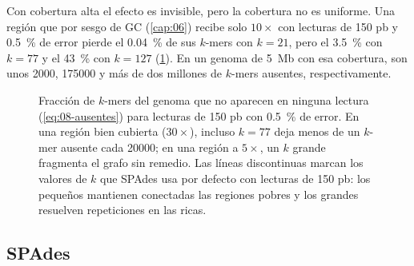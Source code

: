 Con cobertura alta el efecto es invisible, pero la cobertura no es uniforme. Una región que por sesgo de GC (\cref{cap:06}) recibe solo $10\times$ con lecturas de 150 pb y \SI{0,5}{\percent} de error pierde el \SI{0,04}{\percent} de sus $k$-mers con $k=21$, pero el \SI{3,5}{\percent} con $k=77$ y el \SI{43}{\percent} con $k=127$ (\cref{fig:08-ausentes}). En un genoma de \SI{5}{Mb} con esa cobertura, son unos \num{2000}, \num{175000} y más de dos millones de $k$-mers ausentes, respectivamente.

\begin{figure}[t]
\centering
{}
\caption[$k$-mers ausentes según $k$ y la cobertura]{Fracción de $k$-mers del genoma que no aparecen en ninguna lectura (\cref{eq:08-ausentes}) para lecturas de 150 pb con \SI{0,5}{\percent} de error. En una región bien cubierta ($30\times$), incluso $k=77$ deja menos de un $k$-mer ausente cada \num{20000}; en una región a $5\times$, un $k$ grande fragmenta el grafo sin remedio. Las líneas discontinuas marcan los valores de $k$ que SPAdes usa por defecto con lecturas de 150 pb: los pequeños mantienen conectadas las regiones pobres y los grandes resuelven repeticiones en las ricas.}
\label{fig:08-ausentes}
\end{figure}

\subsection{SPAdes}

